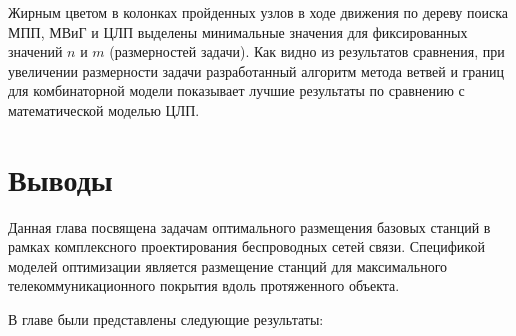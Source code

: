 Жирным цветом в колонках пройденных узлов в ходе движения по дереву поиска МПП, МВиГ и ЦЛП выделены минимальные значения для фиксированных значений $n$ и $m$ (размерностей задачи). Как видно из результатов сравнения, при увеличении размерности задачи разработанный алгоритм метода ветвей и границ для комбинаторной модели показывает лучшие результаты по сравнению с математической моделью ЦЛП.

\section{Выводы}
Данная глава посвящена задачам оптимального размещения базовых станций в рамках комплексного проектирования беспроводных сетей связи. 
Спецификой моделей оптимизации является размещение станций для максимального телекоммуникационного покрытия вдоль протяженного объекта.

В главе были представлены следующие результаты:

